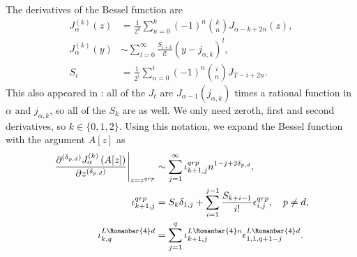 \documentclass[11pt]{article}
\newcommand{\lln}{L{\tiny\Rleft} n}
\newcommand{\lld}{L{\tiny\Rleft} d}
\newcommand{\qg}{q}
\newcommand{\rg}{r}
\newcommand{\pg}{p}
\newcommand{\pd}{d}
\numberwithin{equation}{section}
\newcommand{\Rleft}{\Romanbar{4}}
\begin{document}
The derivatives of the Bessel function are \cite[(10.6.7)]{DLMF}
\begin{align}
	J_\alpha^{(k)}(z) & = \frac{1}{2^k} \sum_{n=0}^k (-1)^n {k \choose n} J_{\alpha-k+2n}(z), \\
	J_\alpha^{(k)}(y) & \sim \sum_{l=0}^\infty \frac{S_{l+k} }{l!} (y-j_{\alpha,k})^{l}, \\ 
	S_{i} & = \frac{1}{2^i} \sum_{n=0}^i (-1)^n {i \choose n} J_{T-i+2n}.
\end{align}
This also appeared in \cite[(2.16-19)]{BogaertIterationFree}: all of the $J_t$ are $J_{\alpha-1}(j_{\alpha,k})$ times a rational function in $\alpha$ and $j_{\alpha,k}$, so all of the $S_k$ are as well. We only need zeroth, first and second derivatives, so $k \in \{0,1,2\}$. Using this notation, we expand the Bessel function with the argument $A[z]$ as
\begin{align}
	\left.\frac{\partial^{(\delta_{\pg,\pd})} J_\alpha^{(k)} \left(A[z] \right) }{\partial z^{(\delta_{\pg,\pd})}} \right|_{z=z^{\qg\rg\pg}}  & \sim \sum_{j=1}^\infty \iota_{k+1,j}^{\qg\rg\pg} n^{1-j + 2\delta_{\pg,\pd}}, \\ 
	\iota_{k+1,j}^{\qg\rg\pg} & = S_k \delta_{1,j} + \sum_{i=1}^{j-1} \frac{S_{k+i-1} }{i!} \epsilon_{i,j}^{\qg\rg\pg}, \quad \pg \neq \pd, \\ %
	\iota_{k, q}^{\lld} & = \sum_{j=1}^{q} \iota_{k+1,j}^{\lln} \epsilon_{1,1,q+1-j}^{\lld}.
\end{align}
\end{document}
